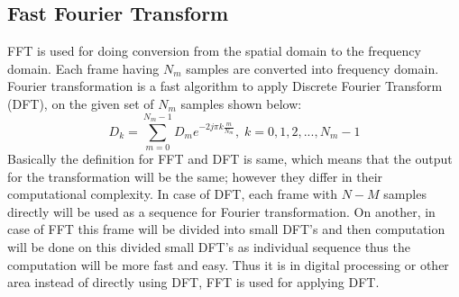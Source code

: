 \documentclass[12pt, a4paper, twoside]{report}
\begin{document}
\subsection{Fast Fourier Transform}
FFT is used for doing conversion from the spatial domain to the frequency domain. Each frame having $N_m$ samples are converted into frequency domain. Fourier transformation is a fast algorithm to apply Discrete Fourier Transform (DFT), on the given set of $N_m$ samples shown below:
\begin{equation*}
D_k = \sum_{m=0}^{N_m -1}D_m e^{-2j\pi k\frac{m}{N_m}}, \; k=0,1,2,...,N_m - 1
\end{equation*}
Basically the definition for FFT and DFT is same, which means that the output for the transformation will be the same; however they differ in their computational complexity. In case of DFT, each frame with $N-M$ samples directly will be used as a sequence for Fourier transformation. On another, in case of FFT this frame will be divided into small DFT’s and then computation will be done on this divided small   DFT’s  as  individual  sequence  thus  the  computation  will  be  more  fast  and  easy.  Thus  it  is  in digital processing or other area instead of directly using DFT, FFT is used for applying DFT.
\end{document}
